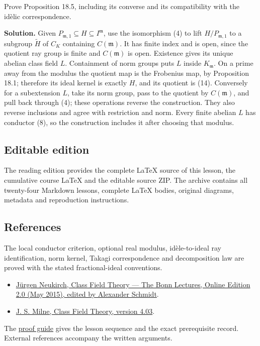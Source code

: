 \documentclass[11pt,a4paper]{article}
\newcommand{\tightlist}{\setlength{\itemsep}{0pt}\setlength{\parskip}{0pt}}
\begin{document}
Prove Proposition 18.5, including its converse and its compatibility
with the idèlic correspondence.

\textbf{Solution.} Given
\(P_{\mathfrak m,1}\subseteq H\subseteq I^{\mathfrak m}\), use the
isomorphism (4) to lift \(H/P_{\mathfrak m,1}\) to a subgroup
\(\widetilde H\) of \(C_K\) containing \(C(\mathfrak m)\). It has finite
index and is open, since the quotient ray group is finite and
\(C(\mathfrak m)\) is open. Existence gives its unique abelian class
field \(L\). Containment of norm groups puts \(L\) inside
\(K_{\mathfrak m}\). On a prime away from the modulus the quotient map
is the Frobenius map, by Proposition 18.1; therefore its ideal kernel is
exactly \(H\), and its quotient is (14). Conversely for a subextension
\(L\), take its norm group, pass to the quotient by \(C(\mathfrak m)\),
and pull back through (4); these operations reverse the construction.
They also reverse inclusions and agree with restriction and norm. Every
finite abelian \(L\) has conductor (8), so the construction includes it
after choosing that modulus.

\subsection{Editable edition}\label{editable-edition}

The reading edition provides the complete LaTeX source of this lesson,
the cumulative course LaTeX and the editable source ZIP. The archive
contains all twenty-four Markdown lessons, complete LaTeX bodies,
original diagrams, metadata and reproduction instructions.

\subsection{References}\label{references}

The local conductor criterion, optional real modulus, idèle-to-ideal ray
identification, norm kernel, Takagi correspondence and decomposition law
are proved with the stated fractional-ideal conventions.

\begin{itemize}
\tightlist
\item
  \href{https://www.mathi.uni-heidelberg.de/~schmidt/Neukirch-en/Neukirch_cft_02_may15.pdf}{Jürgen
  Neukirch, Class Field Theory --- The Bonn Lectures, Online Edition 2.0
  (May 2015), edited by Alexander Schmidt}.
\item
  \href{https://www.jmilne.org/math/CourseNotes/CFT.pdf}{J. S. Milne,
  Class Field Theory, version 4.03}.
\end{itemize}

The \href{../free-proofs.html}{proof guide} gives the lesson sequence
and the exact prerequisite record. External references accompany the
written arguments.
\end{document}
